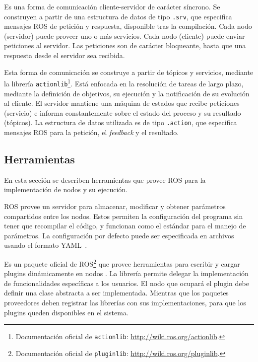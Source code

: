  Es una forma de comunicación cliente-servidor de carácter síncrono. Se construyen a partir de una estructura de datos de tipo \texttt{.srv}, que especifica mensajes ROS de petición y respuesta, disponible tras la compilación. Cada nodo (servidor) puede proveer uno o más servicios. Cada nodo (cliente) puede enviar peticiones al servidor. Las peticiones son de carácter bloqueante, hasta que una respuesta desde el servidor sea recibida.

 Esta forma de comunicación se construye a partir de tópicos y servicios, mediante la librería \texttt{actionlib}\footnote{Documentación oficial de \texttt{actionlib}: \url{http://wiki.ros.org/actionlib}.}. Está enfocada en la resolución de tareas de largo plazo, mediante la definición de objetivos, su ejecución y la notificación de su evolución al cliente. El servidor mantiene una máquina de estados que recibe peticiones (servicio) e informa constantemente sobre el estado del proceso y su resultado (tópicos). La estructura de datos utilizada es de tipo \texttt{.action}, que especifica mensajes ROS para la petición, el \textit{feedback} y el resultado.


\subsection{Herramientas}

En esta sección se describen herramientas que provee ROS para la implementación de nodos y su ejecución.

 ROS provee un servidor para almacenar, modificar y obtener parámetros compartidos entre los nodos. Estos permiten la configuración del programa sin tener que recompilar el código, y funcionan como el estándar para el manejo de parámetros. La configuración por defecto puede ser especificada en archivos usando el formato YAML~\cite{yaml}.

 Es un paquete oficial de ROS\footnote{Documentación oficial de \texttt{pluginlib}: \url{http://wiki.ros.org/pluginlib}.} que provee herramientas para escribir y cargar plugins dinámicamente en nodos \CC. La librería permite delegar la implementación de funcionalidades específicas a los usuarios. El nodo que ocupará el plugin debe definir una clase abstracta a ser implementada. Mientras que los paquetes proveedores deben registrar las librerías con sus implementaciones, para que los plugins queden disponibles en el sistema.


